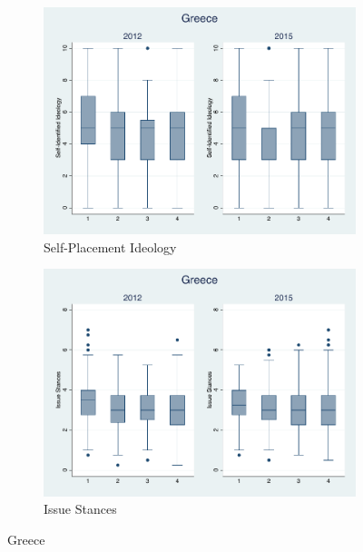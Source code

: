 \documentclass[12pt, titlepage]{article}
\begin{document}
\begin{figure}[H]
	\centering
	\begin{subfigure}[b]{0.475\textwidth}   
		\centering 
		\includegraphics[width=\textwidth]{IdeoBP/Greece}
		\caption{Self-Placement Ideology}
	\end{subfigure}
	\hfill
	\begin{subfigure}[b]{0.475\textwidth}
		\centering 
		\includegraphics[width=\textwidth]{BoxLib/Greece}
		\caption{Issue Stances}
	\end{subfigure}
	\caption{Greece}
	\label{Greece}
\end{figure}
\end{document}
